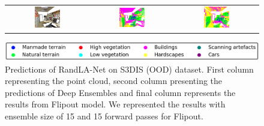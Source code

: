 \begin{figure}[h!]
\begin{tabular}{ccc}
            \includegraphics[width=0.33\textwidth, height=0.16\textheight]{images/seg_output/s3dis_DE/S3DIS_4_RGB.pdf} &
            \includegraphics[width=0.33\textwidth, height=0.16\textheight]{images/seg_output/s3dis_DE/S3DIS_4_Pred.pdf}&
            \includegraphics[width=0.33\textwidth, height=0.16\textheight]{images/seg_output/s3dis_DE/office_42.pdf} \\
        \end{tabular}
        \includegraphics[scale=0.45]{images/legend.png}
        \caption{Predictions of RandLA-Net on S3DIS (OOD) dataset. First column representing the point cloud, second column presenting the predictions of Deep Ensembles and final column represents the results from Flipout model.
        We represented the results with ensemble size of 15 and 15 forward passes for Flipout.}
        \label{fig:de_s3dis_vis}
    \end{figure}
    \FloatBarrier
